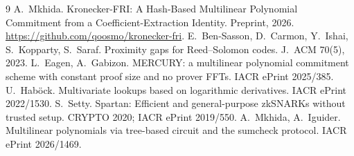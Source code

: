 \documentclass[11pt]{article}
\theoremstyle{definition}
\begin{document}
\begin{thebibliography}{9}
 A.~Mkhida. Kronecker-FRI: A Hash-Based Multilinear Polynomial Commitment from a Coefficient-Extraction Identity. Preprint, 2026. \url{https://github.com/qoosmo/kronecker-fri}.
 E.~Ben-Sasson, D.~Carmon, Y.~Ishai, S.~Kopparty, S.~Saraf. Proximity gaps for Reed--Solomon codes. J.~ACM 70(5), 2023.
 L.~Eagen, A.~Gabizon. MERCURY: a multilinear polynomial commitment scheme with constant proof size and no prover FFTs. IACR ePrint 2025/385.
 U.~Hab\"ock. Multivariate lookups based on logarithmic derivatives. IACR ePrint 2022/1530.
 S.~Setty. Spartan: Efficient and general-purpose zkSNARKs without trusted setup. CRYPTO 2020; IACR ePrint 2019/550.
 A.~Mkhida, A.~Iguider. Multilinear polynomials via tree-based circuit and the sumcheck protocol. IACR ePrint 2026/1469.
\end{thebibliography}
\end{document}
